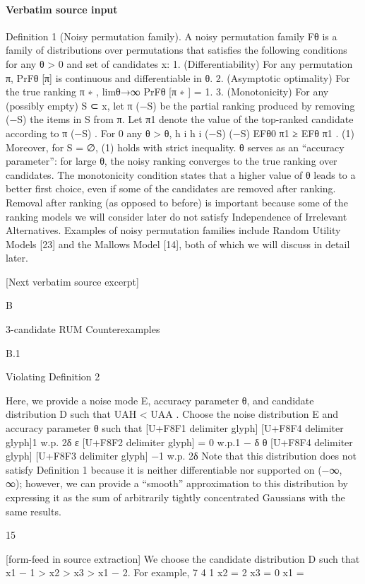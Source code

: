 \documentclass[10pt]{article}
\begin{document}
\paragraph{Verbatim source input}
\begin{ReviewVerbatim}
Definition 1 (Noisy permutation family). A noisy permutation family Fθ is a family of distributions over
permutations that satisfies the following conditions for any θ > 0 and set of candidates x:
1. (Differentiability) For any permutation π, PrFθ [π] is continuous and differentiable in θ.
2. (Asymptotic optimality) For the true ranking π ∗ , limθ→∞ PrFθ [π ∗ ] = 1.
3. (Monotonicity) For any (possibly empty) S ⊂ x, let π (−S) be the partial ranking produced by removing
(−S)
the items in S from π. Let π1
denote the value of the top-ranked candidate according to π (−S) . For
0
any θ > θ,
h
i
h
i
(−S)
(−S)
EFθ0 π1
≥ EFθ π1
.
(1)
Moreover, for S = ∅, (1) holds with strict inequality.
θ serves as an “accuracy parameter”: for large θ, the noisy ranking converges to the true ranking over
candidates. The monotonicity condition states that a higher value of θ leads to a better first choice, even
if some of the candidates are removed after ranking. Removal after ranking (as opposed to before) is
important because some of the ranking models we will consider later do not satisfy Independence of Irrelevant
Alternatives. Examples of noisy permutation families include Random Utility Models [23] and the Mallows
Model [14], both of which we will discuss in detail later.

[Next verbatim source excerpt]

B

3-candidate RUM Counterexamples

B.1

Violating Definition 2

Here, we provide a noise mode E, accuracy parameter θ, and candidate distribution D such that UAH < UAA .
Choose the noise distribution E and accuracy parameter θ such that
[U+F8F1 delimiter glyph]
[U+F8F4 delimiter glyph]1
w.p. 2δ
ε [U+F8F2 delimiter glyph]
= 0
w.p.1 − δ
θ [U+F8F4 delimiter glyph]
[U+F8F3 delimiter glyph]
−1 w.p. 2δ
Note that this distribution does not satisfy Definition 1 because it is neither differentiable nor supported on
(−∞, ∞); however, we can provide a “smooth” approximation to this distribution by expressing it as the
sum of arbitrarily tightly concentrated Gaussians with the same results.

15


[form-feed in source extraction]
We choose the candidate distribution D such that x1 − 1 > x2 > x3 > x1 − 2. For example,
7
4
1
x2 =
2
x3 = 0
x1 =


\end{ReviewVerbatim}
\end{document}
